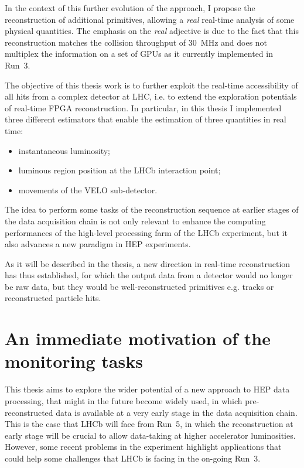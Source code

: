 In the context of this further evolution of the approach, I propose the reconstruction of additional primitives, allowing a \textit{real} real-time analysis of some physical quantities. The emphasis on the \textit{real} adjective is due to the fact that this reconstruction matches the collision throughput of \SI{30}{\mega\hertz} and does not multiplex the information on a set of GPUs as it currently implemented in Run~3.

The objective of this thesis work is to further exploit the real-time accessibility of all hits from a complex detector at LHC, i.e. to extend the exploration potentials of real-time FPGA reconstruction. In particular, in this thesis I implemented three different estimators that enable the estimation of three quantities in real time:
\begin{itemize}
\item instantaneous luminosity;
\item luminous region position at the LHCb interaction point;
\item movements of the VELO sub-detector.
\end{itemize}

The idea to perform some tasks of the reconstruction sequence at earlier stages of the data acquisition chain is not only relevant to enhance the computing performances of the high-level processing farm of the LHCb experiment, but it also advances a new paradigm in HEP experiments. 

As it will be described in the thesis, a new direction in real-time reconstruction has thus established, for which the output data from a detector would no longer be raw data, but they would be well-reconstructed primitives e.g. tracks or reconstructed particle hits.
 

\section{An immediate motivation of the monitoring tasks}
This thesis aims to explore the wider potential of a new approach to HEP data processing, that might in the future become widely used, in which pre-reconstructed data is available at a very early stage in the data acquisition chain. This is the case that LHCb will face from Run~5, in which the reconstruction at early stage will be crucial to allow data-taking at higher accelerator luminosities. However, some recent problems in the experiment highlight applications that could help some challenges that LHCb is facing in the on-going Run~3.


